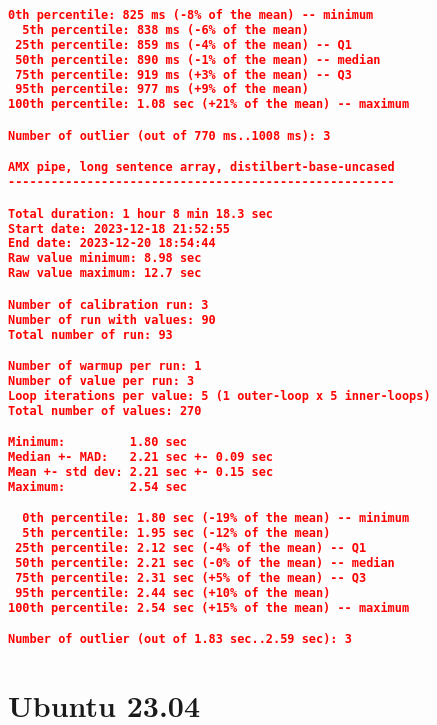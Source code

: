 \begin{lstlisting}[language=json]
  0th percentile: 825 ms (-8% of the mean) -- minimum
  5th percentile: 838 ms (-6% of the mean)
 25th percentile: 859 ms (-4% of the mean) -- Q1
 50th percentile: 890 ms (-1% of the mean) -- median
 75th percentile: 919 ms (+3% of the mean) -- Q3
 95th percentile: 977 ms (+9% of the mean)
100th percentile: 1.08 sec (+21% of the mean) -- maximum

Number of outlier (out of 770 ms..1008 ms): 3

AMX pipe, long sentence array, distilbert-base-uncased
------------------------------------------------------

Total duration: 1 hour 8 min 18.3 sec
Start date: 2023-12-18 21:52:55
End date: 2023-12-20 18:54:44
Raw value minimum: 8.98 sec
Raw value maximum: 12.7 sec

Number of calibration run: 3
Number of run with values: 90
Total number of run: 93

Number of warmup per run: 1
Number of value per run: 3
Loop iterations per value: 5 (1 outer-loop x 5 inner-loops)
Total number of values: 270

Minimum:         1.80 sec
Median +- MAD:   2.21 sec +- 0.09 sec
Mean +- std dev: 2.21 sec +- 0.15 sec
Maximum:         2.54 sec

  0th percentile: 1.80 sec (-19% of the mean) -- minimum
  5th percentile: 1.95 sec (-12% of the mean)
 25th percentile: 2.12 sec (-4% of the mean) -- Q1
 50th percentile: 2.21 sec (-0% of the mean) -- median
 75th percentile: 2.31 sec (+5% of the mean) -- Q3
 95th percentile: 2.44 sec (+10% of the mean)
100th percentile: 2.54 sec (+15% of the mean) -- maximum

Number of outlier (out of 1.83 sec..2.59 sec): 3
\end{lstlisting}

\section{Ubuntu 23.04}

